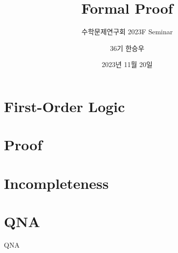 \documentclass{beamer}
\title{Formal Proof}
\subtitle{수학문제연구회 2023F Seminar}
\author{36기 한승우}
\institute{KAIST 수학문제연구회}
\date{2023년 11월 20일}
\begin{document}
\begin{frame}
    \titlepage
\end{frame}



\section{First-Order Logic}


\section{Proof}


\section{Incompleteness}


\section*{QNA}
\begin{frame}{QNA}
    \begin{center}
    \end{center}
\end{frame}
\end{document}

